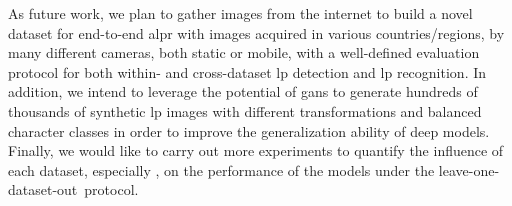 As future work, we plan to gather images from the internet to build a novel dataset for end-to-end \gls*{alpr} with images acquired in various countries/regions, by many different cameras, both static or mobile, with a well-defined evaluation protocol for both within- and cross-dataset \gls*{lp} detection and \gls*{lp} recognition.
In addition, we intend to leverage the potential of \glspl*{gan} to generate hundreds of thousands of synthetic \gls*{lp} images with different transformations and balanced character classes in order to improve the generalization ability of deep models.
Finally, we would like to carry out more experiments to quantify the influence of each dataset, especially \dataset, on the performance of the models under the leave-one-dataset-out~protocol.